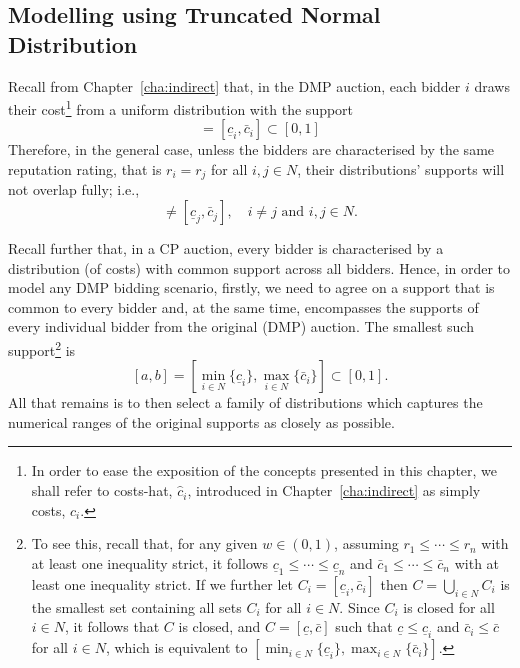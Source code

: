 \subsection{Modelling using Truncated Normal Distribution} %
\label{sub:modeling_using_truncated_normal_distribution_approximation}
Recall from Chapter~\ref{cha:indirect} that, in the DMP auction, each bidder $i$ draws their cost\footnote{In order to ease the exposition of the concepts presented in this chapter, we shall refer to costs-hat, $\hat{c}_i$, introduced in Chapter~\ref{cha:indirect} as simply costs, $c_i$.} from a uniform distribution with the support
\begin{equation*}
  [(1-w)r_i, (1-w)r_i + w] = [\underline{c}_i, \bar{c}_i] \subset [0,1]
\end{equation*}
Therefore, in the general case, unless the bidders are characterised by the same reputation rating, that is $r_i=r_j$ for all $i,j\in N$, their distributions' supports will not overlap fully; i.e.,
\begin{equation*}
  [\underline{c}_i,\bar{c}_i] \neq [\underline{c}_j,\bar{c}_j], \quad i\neq j \text{ and } i,j\in N.
\end{equation*}

Recall further that, in a CP auction, every bidder is characterised by a distribution (of costs) with common support across all bidders. Hence, in order to model any DMP bidding scenario, firstly, we need to agree on a support that is common to every bidder and, at the same time, encompasses the supports of every individual bidder from the original (DMP) auction. The smallest such support\footnote{To see this, recall that, for any given $w\in (0,1)$, assuming $r_1\leq\cdots\leq r_n$ with at least one inequality strict, it follows $\underline{c}_1\leq\cdots\leq\underline{c}_n$ and $\bar{c}_1\leq\cdots\leq\bar{c}_n$ with at least one inequality strict. If we further let $C_i = [\underline{c}_i, \bar{c}_i]$ then $C = \bigcup_{i\in N} C_i$ is the smallest set containing all sets $C_i$ for all $i\in N$. Since $C_i$ is closed for all $i\in N$, it follows that $C$ is closed, and $C = [\underline{c}, \bar{c}]$ such that $\underline{c} \leq \underline{c}_i$ and $\bar{c}_i\leq \bar{c}$ for all $i\in N$, which is equivalent to $[\min_{i\in N}\{\underline{c}_i\}, \max_{i\in N}\{\bar{c}_i\}]$.} is
\begin{equation}
  \label{eq:domain_common_priors_approximation}
  [a,b] = \displaystyle\left[\min_{i\in N}\{\underline{c}_i\}, \max_{i\in N}\{\bar{c}_i\}\right] \subset [0,1].
\end{equation}
All that remains is to then select a family of distributions which captures the numerical ranges of the original supports as closely as possible.

